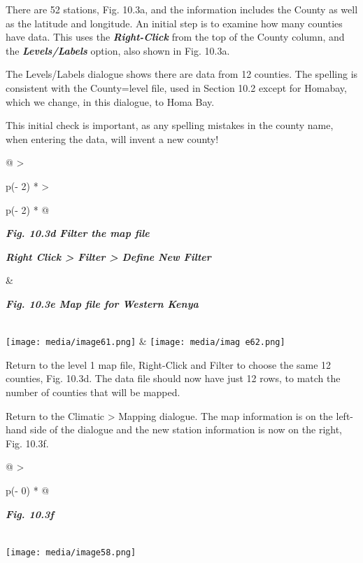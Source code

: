 \documentclass[
  letterpaper,
  DIV=11,
  numbers=noendperiod]{scrreprt}
\begin{document}
There are 52 stations, Fig. 10.3a, and the information includes the
County as well as the latitude and longitude. An initial step is to
examine how many counties have data. This uses the
\textbf{\emph{Right-Click}} from the top of the County column, and the
\textbf{\emph{Levels/Labels}} option, also shown in Fig. 10.3a.

The Levels/Labels dialogue shows there are data from 12 counties. The
spelling is consistent with the County=level file, used in Section 10.2
except for Homabay, which we change, in this dialogue, to Homa Bay.

This initial check is important, as any spelling mistakes in the county
name, when entering the data, will invent a new county!

\begin{longtable}[]{@{}
  >{\raggedright\arraybackslash}p{(\columnwidth - 2\tabcolsep) * }
  >{\raggedright\arraybackslash}p{(\columnwidth - 2\tabcolsep) * }@{}}
\toprule\noalign{}
\begin{minipage}[b]{\linewidth}\raggedright
\textbf{\emph{Fig. 10.3d Filter the map file}}

\textbf{\emph{Right Click \textgreater{} Filter \textgreater{} Define
New Filter}}
\end{minipage} & \begin{minipage}[b]{\linewidth}\raggedright
\textbf{\emph{Fig. 10.3e Map file for Western Kenya}}
\end{minipage} \\
\midrule\noalign{}
\endhead
\bottomrule\noalign{}
\endlastfoot
\texttt{[image: media/image61.png]} &
\texttt{[image: media/imag e62.png]} \\
\end{longtable}

Return to the level 1 map file, Right-Click and Filter to choose the
same 12 counties, Fig. 10.3d. The data file should now have just 12
rows, to match the number of counties that will be mapped.

Return to the Climatic \textgreater{} Mapping dialogue. The map
information is on the left-hand side of the dialogue and the new station
information is now on the right, Fig. 10.3f.

\begin{longtable}[]{@{}
  >{\raggedright\arraybackslash}p{(\columnwidth - 0\tabcolsep) * }@{}}
\toprule\noalign{}
\begin{minipage}[b]{\linewidth}\raggedright
\textbf{\emph{Fig. 10.3f}}
\end{minipage} \\
\midrule\noalign{}
\endhead
\bottomrule\noalign{}
\endlastfoot
\texttt{[image: media/image58.png]} \\
\end{longtable}
\end{document}

